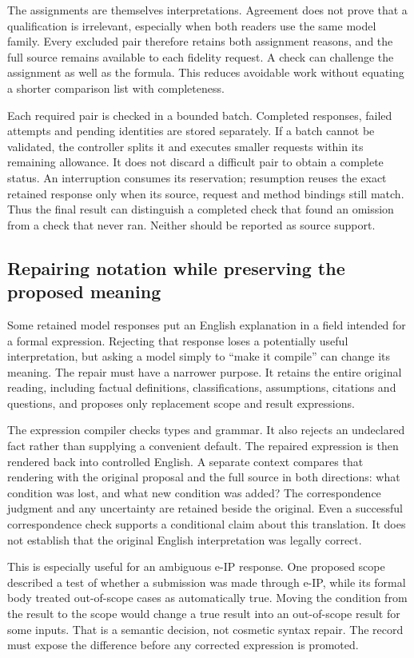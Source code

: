 The assignments are themselves interpretations. Agreement does not prove that
a qualification is irrelevant, especially when both readers use the same model
family. Every excluded pair therefore retains both assignment reasons, and the
full source remains available to each fidelity request. A check can challenge
the assignment as well as the formula. This reduces avoidable work without
equating a shorter comparison list with completeness.

Each required pair is checked in a bounded batch. Completed responses, failed
attempts and pending identities are stored separately. If a batch cannot be
validated, the controller splits it and executes smaller requests within its
remaining allowance. It does not discard a difficult pair to obtain a complete
status. An interruption consumes its reservation; resumption reuses the exact
retained response only when its source, request and method bindings still match.
Thus the final result can distinguish a completed check that found an omission
from a check that never ran. Neither should be reported as source support.

\subsection{Repairing notation while preserving the proposed meaning}

Some retained model responses put an English explanation in a field intended
for a formal expression. Rejecting that response loses a potentially useful
interpretation, but asking a model simply to ``make it compile'' can change its
meaning. The repair must have a narrower purpose. It retains the entire original
reading, including factual definitions, classifications, assumptions, citations
and questions, and proposes only replacement scope and result expressions.

The expression compiler checks types and grammar. It also rejects an undeclared
fact rather than supplying a convenient default. The repaired expression is
then rendered back into controlled English. A separate context compares that
rendering with the original proposal and the full source in both directions:
what condition was lost, and what new condition was added? The correspondence
judgment and any uncertainty are retained beside the original. Even a successful
correspondence check supports a conditional claim about this translation. It
does not establish that the original English interpretation was legally correct.

This is especially useful for an ambiguous e-IP response. One proposed scope
described a test of whether a submission was made through e-IP, while its formal
body treated out-of-scope cases as automatically true. Moving the condition from
the result to the scope would change a true result into an out-of-scope result
for some inputs. That is a semantic decision, not cosmetic syntax repair. The
record must expose the difference before any corrected expression is promoted.


